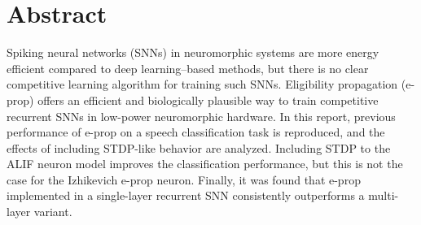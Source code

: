 \begingroup
\let\clearpage\relax
\let\cleardoublepage\relax
\let\cleardoublepage\relax

\chapter*{Abstract}
Spiking neural networks (SNNs) in neuromorphic systems are more energy efficient compared to deep learning--based methods, but there is no clear competitive learning algorithm for training such SNNs.
Eligibility propagation (e-prop) offers an efficient and biologically plausible way to train competitive recurrent SNNs in low-power neuromorphic hardware.
In this report, previous performance of e-prop on a speech classification task is reproduced, and the effects of including STDP-like behavior are analyzed.
Including STDP to the ALIF neuron model improves the classification performance, but this is not the case for the Izhikevich e-prop neuron.
Finally, it was found that e-prop implemented in a single-layer recurrent SNN consistently outperforms a multi-layer variant.

\endgroup

\vfill
